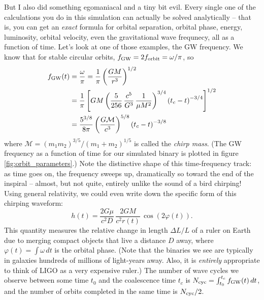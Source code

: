 \documentclass[11pt]{article}
\begin{document}
\begin{enumerate}
\hspace{15pt} But I also did something egomaniacal and a tiny bit evil. Every single one of the calculations you do in this simulation can actually be solved analytically -- that is, you can get an \emph{exact} formula for orbital separation, orbital phase, energy, luminosity, orbital velocity, even the gravitational wave frequnecy, all as a function of time. Let's look at one of those examples, the GW frequency. We know that for stable circular orbits, $f_{\rm GW} = 2 f_{\rm orbit} = \omega/\pi$, so
\begin{align*}
f_{\rm GW}(t) &= \frac{\omega}{\pi} = \frac{1}{\pi} \left( \frac{GM}{r^3} \right)^{1/2} \\
  &= \frac{1}{\pi} \left[ GM \left( \frac{5}{256} \, \frac{c^5}{G^3} \, \frac{1}{\mu M^2} \right)^{3/4} \left(t_c - t\right)^{-3/4} \right]^{1/2} \\
  &= \frac{5^{3/8}}{8\pi} \left( \frac{G\mathcal{M}}{c^3} \right)^{5/8} \left(t_c - t\right)^{-3/8}
\end{align*}
where $\mathcal{M} = (m_1 m_2)^{3/5}/(m_1 + m_2)^{1/5}$ is called the \textit{chirp mass}. (The GW frequency as a function of time for our simulated binary is plotted in figure \ref{fig:orbit_parameters}.) Note the distinctive shape of this time-frequency track: as time goes on, the frequency sweeps up, dramatically so toward the end of the inspiral -- almost, but not quite, entirely unlike the sound of a bird chirping! Using general relativity, we could even write down the specific form of this chirping waveform:
\begin{equation}
h(t) = \frac{2G\mu}{c^2D} \, \frac{2GM}{c^2r(t)} \, \cos\left(2\varphi(t)\right).
\end{equation}
This quantity measures the relative change in length $\Delta L/L$ of a ruler on Earth due to merging compact objects that live a distance $D$ away, where $\varphi(t) = \int\omega\,dt$ is the orbital phase. (Note that the binaries we see are typically in galaxies hundreds of millions of light-years away. Also, it is \emph{entirely} appropriate to think of LIGO as a very expensive ruler.) The number of wave cycles we observe between some time $t_0$ and the coalescence time $t_c$ is $N_{\rm cyc} = \int_{t_0}^{t_c} f_{\rm GW}(t)\,dt$, and the number of orbits completed in the same time is $N_{\rm cyc}/2$.


\end{enumerate}
\end{document}
